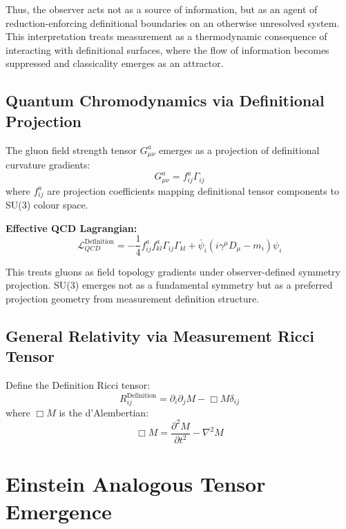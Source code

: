 Thus, the observer acts not as a source of information, but as an agent of reduction-enforcing definitional boundaries on an otherwise unresolved system. This interpretation treats measurement as a thermodynamic consequence of interacting with definitional surfaces, where the flow of information becomes suppressed and classicality emerges as an attractor.


\subsection{Quantum Chromodynamics via Definitional Projection}

The gluon field strength tensor $G^a_{\mu\nu}$ emerges as a projection of definitional curvature gradients:
\begin{equation}
G^a_{\mu\nu} = f^a_{ij} \Gamma_{ij}
\end{equation}
where $f^a_{ij}$ are projection coefficients mapping definitional tensor components to SU(3) colour space.

\textbf{Effective QCD Lagrangian:}
\begin{equation}
\mathcal{L}_{QCD}^{\text{Definition}} = - \frac{1}{4} f^a_{ij} f^{a}_{kl} \Gamma_{ij} \Gamma_{kl} + \bar{\psi}_i (i \gamma^\mu D_\mu - m_i) \psi_i
\end{equation}

This treats gluons as field topology gradients under observer-defined symmetry projection. SU(3) emerges not as a fundamental symmetry but as a preferred projection geometry from measurement definition structure.

\subsection{General Relativity via Measurement Ricci Tensor}

Define the Definition Ricci tensor:
\begin{equation}
R_{ij}^{\text{Definition}} = \partial_i \partial_j M - \Box M \delta_{ij}
\end{equation}
where $\Box M$ is the d'Alembertian:
\begin{equation}
\Box M = \frac{\partial^2 M}{\partial t^2} - \nabla^2 M
\end{equation}

\section{Einstein Analogous Tensor Emergence}


